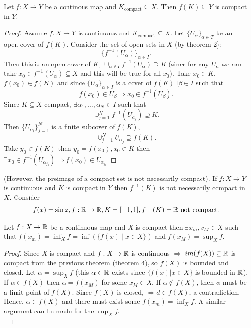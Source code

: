 \documentclass[a4paper]{article}
\begin{document}
 \begin{theorem}
   Let $f:X \to Y$ be a continous map and $K_{\text{compact}} \subseteq X$. Then $f(K) \subseteq Y$ is compact in $Y$. 

    \begin{proof}
      Assume $f: X \to Y$ is continuous and  $K_{\text{compact}} \subseteq X$. Let $\{U_{\alpha}\}_{\alpha \in T} $ be an open cover of $f(K)$. Consider the set of open sets in  $X$ (by theorem 2):
      \[
      \{f^{-1}(U_{\alpha})\}_{\alpha \in I} 
      .\]
 Then this is an open cover of $K$,  $\cup_{\alpha \in I} f^{-1}(U_{\alpha}) \supseteq K$ (since for any $U_\alpha$ we can take  $x_0 \in f^{-1}(U_{\alpha}) \subseteq X$ and this will be true for all $x_0$). Take $x_0 \in K$,  $f(x_0) \in f(K)$ and since  $\{U_{\alpha}\}_{\alpha \in I} $ is a cover of $f(K) \exists \beta \in I$ such that 
 \[
 f(x_0) \in U_{\beta} \Rightarrow x_0 \in f^{-1}(U_{\beta})
 .\] 
 Since $K \subseteq X$ compact,  $\exists \alpha_1, \ldots, \alpha_N \in I$ such that 
 \[
 \cup_{j=1}^{N} f^{-1} (U_{\alpha_j}) \supseteq K
 .\]
 Then $\{U_{\alpha_j}\}_{j=1}^{N}$ is a finite subcover of $f(K)$,
  \[
 \cup_{j=1}^{N} U_{\alpha_j} \supseteq f(K)
 .\] Take $y_0 \in f(K)$ then  $y_0 = f(x_0), x_0 \in K$ then $\exists x_0 \in f^{-1}(U_{\alpha_{j_0}}) \Rightarrow f(x_0) \in U_{\alpha_{j_0}}$  
    \end{proof}
    \end{theorem}

 \begin{remark}
   (However, the preimage of a compact set is not necessarily compact). If $f: X \to Y$ is continuous and  $K$ is compact in $Y$ then  $f^{-1}(K)$ is not necessarily compact in $X$. Consider
    \[
      f(x) = \sin x, f: \mathbb{R} \to \mathbb{R}, K= [-1,1], f^{-1}(K) = \mathbb{R} \text{ not compact} 
   .\] 
 \end{remark}

 \begin{theorem}
   Let $f:X \to \mathbb{R}$ be a continuous map and $X$ is compact then  $\exists x_m, x_M \in X$ such that $f(x_m) = \inf_{X} f = \inf\left( \{f(x) \mid  x\in X\}  \right) $ and $f(x_M) = \sup_{X} f$. 

   \begin{proof}
     Since $X$ is compact and $f:X \to \mathbb{R}$ is continuous $\Rightarrow$  $im(f(X)) \subseteq \mathbb{R}$ is compact from the previous theorem (theorem 4), so $f(X)$ is bounded and closed. Let $\alpha = \sup_{X} f$ (this $\alpha \in \mathbb{R}$ exists since $\{f(x) | x \in X\} $ is bounded in $\mathbb{R}$). If $\alpha \in f(X)$ then  $\alpha = f(x_M)$ for some $x_M \in X$. If $\alpha \not\in f(X)$, then  $\alpha$ must be a limit point of  $f(X)$. Since  $f(X)$ is closed, $\Rightarrow d \in f(X)$, a contradiction. Hence, $\alpha \in f(X)$ and there must exist some  $f(x_m) = \inf_X f$. A similar argument can be made for the  $\sup_X f$.\\
   \end{proof}
 \end{theorem}
\end{document}
